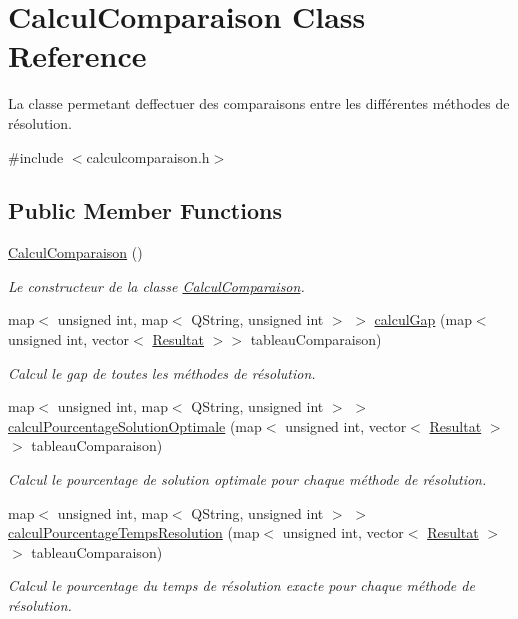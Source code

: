 \hypertarget{classCalculComparaison}{}\section{Calcul\+Comparaison Class Reference}
\label{classCalculComparaison}


La classe permetant d\textquotesingle{}effectuer des comparaisons entre les différentes méthodes de résolution.  




{\ttfamily \#include $<$calculcomparaison.\+h$>$}

\subsection*{Public Member Functions}
\begin{DoxyCompactItemize}
\item 
\hyperlink{classCalculComparaison_af2712af8a2e61a46bae912a4784cc285}{Calcul\+Comparaison} ()
\begin{DoxyCompactList}\small\item\em Le constructeur de la classe \hyperlink{classCalculComparaison}{Calcul\+Comparaison}. \end{DoxyCompactList}\item 
map$<$ unsigned int, map$<$ Q\+String, unsigned int $>$ $>$ \hyperlink{classCalculComparaison_ada2ba7f37482b4261450e38a8aeed123}{calcul\+Gap} (map$<$ unsigned int, vector$<$ \hyperlink{classResultat}{Resultat} $>$$>$ tableau\+Comparaison)
\begin{DoxyCompactList}\small\item\em Calcul le gap de toutes les méthodes de résolution. \end{DoxyCompactList}\item 
map$<$ unsigned int, map$<$ Q\+String, unsigned int $>$ $>$ \hyperlink{classCalculComparaison_a2e68afe2dcc785f580d7e0a365c2b607}{calcul\+Pourcentage\+Solution\+Optimale} (map$<$ unsigned int, vector$<$ \hyperlink{classResultat}{Resultat} $>$$>$ tableau\+Comparaison)
\begin{DoxyCompactList}\small\item\em Calcul le pourcentage de solution optimale pour chaque méthode de résolution. \end{DoxyCompactList}\item 
map$<$ unsigned int, map$<$ Q\+String, unsigned int $>$ $>$ \hyperlink{classCalculComparaison_a95460e5474d2abafd7a1c861d65785ea}{calcul\+Pourcentage\+Temps\+Resolution} (map$<$ unsigned int, vector$<$ \hyperlink{classResultat}{Resultat} $>$$>$ tableau\+Comparaison)
\begin{DoxyCompactList}\small\item\em Calcul le pourcentage du temps de résolution exacte pour chaque méthode de résolution. \end{DoxyCompactList}\end{DoxyCompactItemize}


